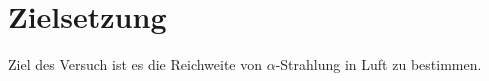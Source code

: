 
\section{Zielsetzung}
\label{sec:Zielsetzung}

Ziel des Versuch ist es die Reichweite von $\alpha$-Strahlung in Luft zu bestimmen.
